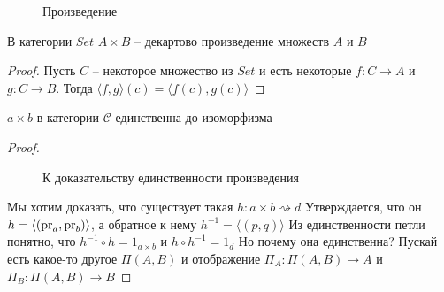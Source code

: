 \begin{figure}[h]
  \centering
  
  \caption{Произведение}
  \label{fig:multiplication}
\end{figure}

\begin{stmt}
  В категории $Set$ $A \times B$ -- декартово произведение множеств $A$ и $B$
\end{stmt}
\begin{proof}
  Пусть $C$ -- некоторое множество из $Set$ и есть некоторые $f \colon C \to A$ и
  $g \colon C \to B$. Тогда $\langle f, g \rangle (c) = \langle f(c), g(c) \rangle$
\end{proof}

\begin{stmt}
  $a \times b$ в категории $\mathcal{C}$ единственна до изоморфизма
\end{stmt}
\begin{proof}
  \begin{figure}[h]
    \centering
    \caption{К доказательству единственности произведения}
    \label{fig:multiplication-uniqueness}
  \end{figure}
  Мы хотим доказать, что существует такая $h \colon a \times b \rightsquigarrow d$
  Утверждается, что он $h = \langle (\operatorname{pr}_a, \operatorname{pr}_b) \rangle$, а обратное к нему $h^{-1}
  = \langle (p, q) \rangle$
  Из единственности петли понятно, что $h^{-1} \circ h = 1_{a \times b}$ и $h
  \circ h^{-1} = 1_d$
  Но почему она единственна? Пускай есть какое-то другое $\Pi(A, B)$ и отображение
  $\Pi_A \colon \Pi(A, B) \to A$ и $\Pi_B \colon \Pi(A, B) \to B$
\end{proof}

